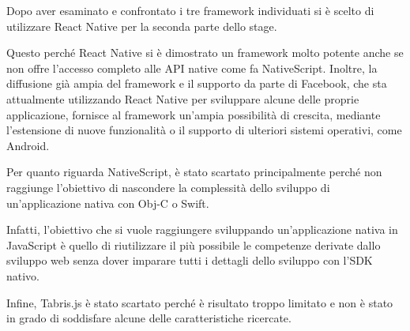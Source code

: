 Dopo aver esaminato e confrontato i tre framework individuati si è scelto di utilizzare React Native per la seconda parte dello stage.

Questo perché React Native si è dimostrato un framework molto potente anche se non offre l'accesso completo alle API native come fa NativeScript.
Inoltre, la diffusione già ampia del framework e il supporto da parte di Facebook, che sta attualmente utilizzando React Native per sviluppare alcune delle proprie applicazione, fornisce al framework un'ampia possibilità di crescita, mediante l'estensione di nuove funzionalità o il supporto di ulteriori sistemi operativi, come Android.

Per quanto riguarda NativeScript, è stato scartato principalmente perché non raggiunge l'obiettivo di nascondere la complessità dello sviluppo di un'applicazione nativa con Obj-C o Swift.

Infatti, l'obiettivo che si vuole raggiungere sviluppando un'applicazione nativa in JavaScript è quello di riutilizzare il più possibile le competenze derivate dallo sviluppo web senza dover imparare tutti i dettagli dello sviluppo con l'SDK nativo.

Infine, Tabris.js è stato scartato perché è risultato troppo limitato e non è stato in grado di soddisfare alcune delle caratteristiche ricercate.




